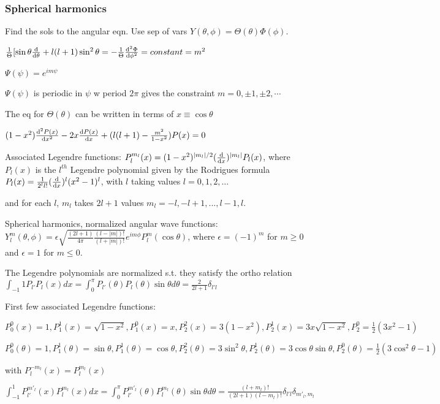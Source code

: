 \subsubsection{Spherical harmonics}

Find the sols to the angular eqn. Use sep of vars $Y(\theta, \phi) = \Theta(\theta) \Phi(\phi)$.

$\frac{1}{\Theta} [\sin\theta \dv{}{\theta} (\sin \theta \dv{\Theta}{\theta}) + l(l+1) \sin^2 \theta = - \frac{1}{\Theta} \dv[2]{\Phi}{\phi} = constant = m^2$

$\Psi(\psi) = e^{im\psi}$

$\Psi(\psi)$ is periodic in $\psi$ w period $2 \pi$ gives the constraint $m = 0, \pm 1, \pm 2, \cdots$

The eq for $\Theta(\theta)$ can be written in terms of $x \equiv \cos \theta$

$(1 - x^2) \dv[2]{P(x)}{x} - 2x \dv{P(x)}{x} + (l(l+1) - \frac{m^2}{1-x^2}) P(x) = 0$

Associated Legendre functions: $P_l^{m_l}(x) = (1-x^2)^{|m_l|/2} (\dv{}{x})^{|m_l|} P_l(x)$,
where $P_l(x)$ is the $l^{th}$ Legendre polynomial given by the Rodrigues formula $P_l(x) = \frac{1}{2^l l!} (\dv{}{x})^l (x^2 - 1)^l$, with $l$ taking values $l=0, 1, 2, ...$

and for each $l$, $m_l$ takes $2l + 1$ values $m_l = -l, -l+1, ..., l-1, l$.

Spherical harmonics, normalized angular wave functions: $Y_l^m (\theta, \phi) = \epsilon \sqrt{\frac{(2l+1)}{4 \pi} \frac{(l-|m|)!}{(l+|m|)!}} e^{im \phi} P_l^m (\cos \theta)$, where $\epsilon = (-1)^m$ for $m \geq 0$ and $\epsilon = 1$ for $m \leq 0$. 

The Legendre polynomials are normalized s.t. they satisfy the ortho relation $\int_{-1}{1} P_{l'} P_l(x) dx = \int_0^{\pi} P_{l'}(\theta) P_l(\theta) \sin \theta d \theta = \frac{2}{2 l + 1} \delta_{l' l}$

First few associated Legendre functions:

$P_0^0(x) = 1, P_1^1(x) = \sqrt{1 - x^2}, P_1^0(x) = x, P_2^2(x) = 3(1-x^2), P_2^1(x) = 3x \sqrt{1 - x^2}, P_2^0 = \frac{1}{2} (3x^2 - 1)$

$P_0^0(\theta) = 1, P_1^1(\theta) = \sin \theta, P_1^1(\theta) = \cos \theta, P_2^2 (\theta) = 3 \sin^2 \theta, P_2^1(\theta) = 3 \cos \theta \sin \theta, P_2^0(\theta) = \frac{1}{2} (3 \cos^2 \theta - 1)$

with $P_l^{-m_l}(x) = P_l^{m_l}(x)$

$\int_{-1}^{1} P_{l'}^{m'_l} (x) P_{l}^{m_l} (x) dx = \int_0^{\pi} P_{l'}^{m'_l}(\theta) P_l^{m_l} (\theta) \sin \theta d \theta = \frac{(l+m_l)!}{(2l+1)(l-m_l)!} \delta_{l'l} \delta_{m'_l, m_l}$

